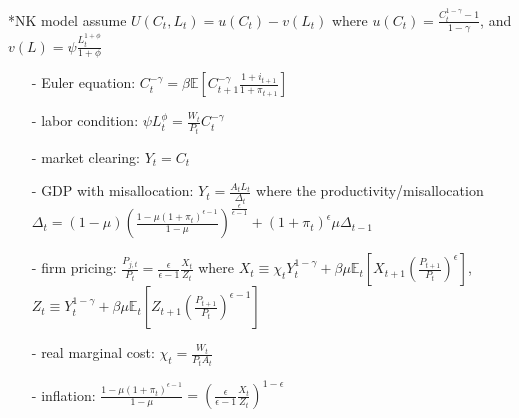 \documentclass[10pt,a4paper]{article}
\makeatletter
\renewcommand{\subsection}{\@startsection{subsection}{1}{0mm}{.2ex}{.2ex}{\small\bfseries}}
\makeatother
\begin{document}
\begin{multicols*}{3}
\subsection*{NK model}
assume $U(C_t,L_t)=u(C_t)-v(L_t)$ where $u(C_t) = \frac{C_t^{1-\gamma}-1}{1-\gamma}$, and $v(L)=\psi\frac{L_t^{1+\phi}}{1+\phi}$
    \begin{itemize}
        \item[-] Euler equation: $C_t^{-\gamma} = \beta\mathbb{E}\left[C_{t+1}^{-\gamma}\frac{1+i_{t+1}}{1+\pi_{t+1}}\right]$
        \item[-] labor condition: $\psi L_t^{\phi} = \frac{W_t}{P_t}C_t^{-\gamma}$
        \item[-] market clearing: $Y_t= C_t$
        \item[-] GDP with misallocation: $Y_t=\frac{A_tL_t}{\Delta_t}$ where the productivity/misallocation $\Delta_t = (1-\mu)\left(\frac{1-\mu(1+\pi_t)^{\epsilon-1}}{1-\mu}\right)^{\frac{\epsilon}{\epsilon-1}}+(1+\pi_t)^{\epsilon}\mu\Delta_{t-1}$
        \item[-] firm pricing: $\frac{P_{j,t}}{P_t}=\frac{\epsilon}{\epsilon-1}\frac{X_t}{Z_t}$ where $X_t\equiv \chi_t Y_t^{1-\gamma}+\beta\mu\mathbb{E}_t\left[X_{t+1}\left(\frac{P_{t+1}}{P_t}\right)^{\epsilon}\right]$, $Z_t\equiv Y_t^{1-\gamma}+\beta\mu\mathbb{E}_t\left[Z_{t+1}\left(\frac{P_{t+1}}{P_t}\right)^{\epsilon-1}\right]$
        \item[-] real marginal cost: $\chi_t = \frac{W_t}{P_tA_t}$
        \item[-] inflation: $\frac{1-\mu(1+\pi_t)^{\epsilon-1}}{1-\mu} = \left(\frac{\epsilon}{\epsilon-1}\frac{X_t}{Z_t}\right)^{1-\epsilon}$
    \end{itemize}
\vspace{2pt}
\end{multicols*}
\end{document}

